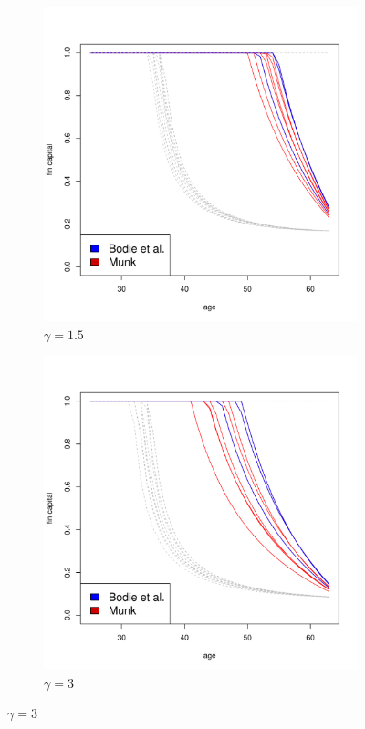 \documentclass[]{elsarticle}
\begin{document}
\begin{figure}[h!]
	\centering
    \begin{subfigure}{0.45\textwidth}
		\centering
		\includegraphics[scale=0.3]{figs/individuals15.pdf}
		\caption{$\gamma = 1.5$}
	\end{subfigure}
	\hfill
    \begin{subfigure}{0.45\textwidth}
		\centering
		\includegraphics[scale=0.3]{figs/individuals3.pdf}
		\caption{$\gamma = 3$}
	\end{subfigure}
\end{figure}
\end{document}
